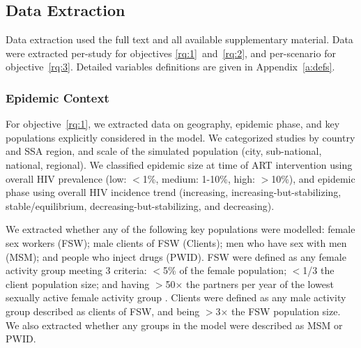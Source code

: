 \subsection{Data Extraction}
\label{ss:meth:data}
Data extraction used the full text and all available supplementary material.
Data were extracted per-study for objectives \ref{rq:1}~and~\ref{rq:2}, and
per-scenario for objective~\ref{rq:3}.
Detailed variables definitions are given in Appendix~\ref{a:defs}.
\subsubsection{Epidemic Context}
\label{sss:meth:context}
For objective~\ref{rq:1}, we extracted data on
geography, epidemic phase, and key populations explicitly considered in the model.
We categorized studies by country and SSA region, and
scale of the simulated population (city, sub-national, national, regional).
We classified epidemic size at time of ART intervention using
overall HIV prevalence (low: $<$1\%, medium: 1-10\%, high: $>$10\%),
and epidemic phase using overall HIV incidence trend
(increasing, increasing-but-stabilizing, stable/equilibrium, decreasing-but-stabilizing, and decreasing).
\par
We extracted whether any of the following key populations were modelled:
female sex workers (FSW);
male clients of FSW (Clients);
men who have sex with men (MSM); and
people who inject drugs (PWID).
FSW were defined as any female activity group meeting 3 criteria:
{$<$5\%} of the female population;
{$<$1/3} the client population size; and
having {$>$50$\times$} the partners per year of
the lowest sexually active female activity group \cite{Vandepitte2006,Scorgie2012}.
Clients were defined as any male activity group
described as clients of FSW, and being {$>$3$\times$} the FSW population size.
We also extracted whether any groups in the model were described as MSM or PWID.
